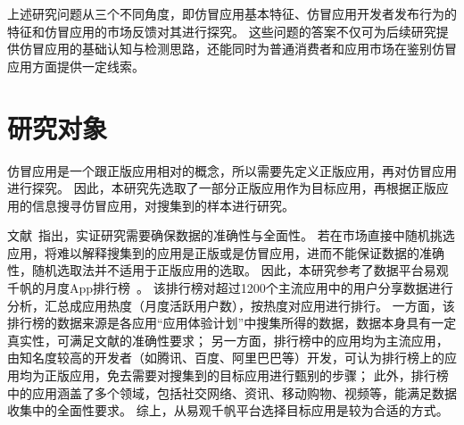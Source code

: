上述研究问题从三个不同角度，即仿冒应用基本特征、仿冒应用开发者发布行为的特征和仿冒应用的市场反馈对其进行探究。
这些问题的答案不仅可为后续研究提供仿冒应用的基础认知与检测思路，还能同时为普通消费者和应用市场在鉴别仿冒应用方面提供一定线索。






\section{研究对象}
仿冒应用是一个跟正版应用相对的概念，所以需要先定义正版应用，再对仿冒应用进行探究。
因此，本研究先选取了一部分正版应用作为目标应用，再根据正版应用的信息搜寻仿冒应用，对搜集到的样本进行研究。

文献~\cite{kitchenham2002preliminary}指出，实证研究需要确保数据的准确性与全面性。
若在市场直接中随机挑选应用，将难以解释搜集到的应用是正版或是仿冒应用，进而不能保证数据的准确性，随机选取法并不适用于正版应用的选取。
因此，本研究参考了数据平台易观千帆的月度App排行榜~\cite{yiguanqianfan}。
该排行榜对超过1200个主流应用中的用户分享数据进行分析，汇总成应用热度（月度活跃用户数），按热度对应用进行排行。
一方面，该排行榜的数据来源是各应用``应用体验计划''中搜集所得的数据，数据本身具有一定真实性，可满足文献的准确性要求；
另一方面，排行榜中的应用均为主流应用，由知名度较高的开发者（如腾讯、百度、阿里巴巴等）开发，可认为排行榜上的应用均为正版应用，免去需要对搜集到的目标应用进行甄别的步骤；
此外，排行榜中的应用涵盖了多个领域，包括社交网络、资讯、移动购物、视频等，能满足数据收集中的全面性要求。
综上，从易观千帆平台选择目标应用是较为合适的方式。

